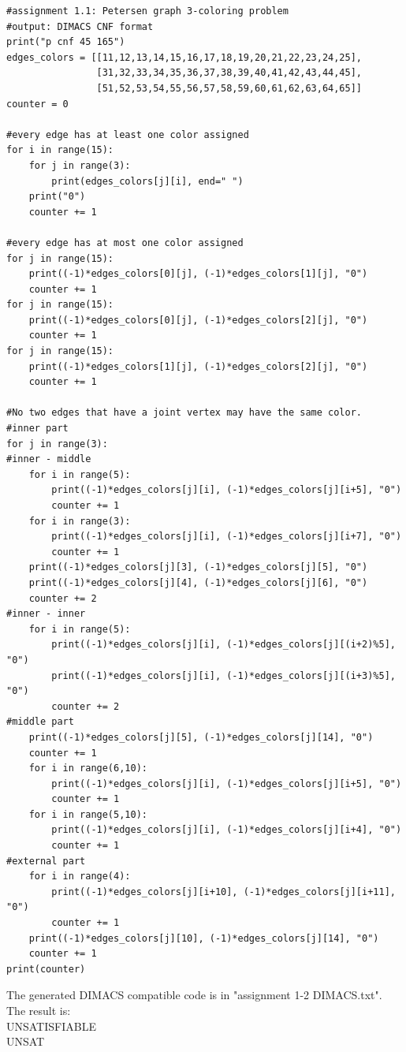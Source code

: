 \documentclass[a4paper,11pt]{article}
\theoremstyle{mytheor}
\begin{document}
\begin{lstlisting}[label={list:second},caption=Python code-DIMAC generator.]
#assignment 1.1: Petersen graph 3-coloring problem
#output: DIMACS CNF format
print("p cnf 45 165")
edges_colors = [[11,12,13,14,15,16,17,18,19,20,21,22,23,24,25],
                [31,32,33,34,35,36,37,38,39,40,41,42,43,44,45],
                [51,52,53,54,55,56,57,58,59,60,61,62,63,64,65]]
counter = 0

#every edge has at least one color assigned
for i in range(15):
    for j in range(3):
        print(edges_colors[j][i], end=" ")
    print("0")
    counter += 1
    
#every edge has at most one color assigned
for j in range(15):
    print((-1)*edges_colors[0][j], (-1)*edges_colors[1][j], "0")
    counter += 1
for j in range(15):
    print((-1)*edges_colors[0][j], (-1)*edges_colors[2][j], "0")
    counter += 1
for j in range(15):
    print((-1)*edges_colors[1][j], (-1)*edges_colors[2][j], "0")
    counter += 1

#No two edges that have a joint vertex may have the same color.
#inner part
for j in range(3):
#inner - middle
    for i in range(5):
        print((-1)*edges_colors[j][i], (-1)*edges_colors[j][i+5], "0")
        counter += 1
    for i in range(3):
        print((-1)*edges_colors[j][i], (-1)*edges_colors[j][i+7], "0")
        counter += 1
    print((-1)*edges_colors[j][3], (-1)*edges_colors[j][5], "0")
    print((-1)*edges_colors[j][4], (-1)*edges_colors[j][6], "0")
    counter += 2
#inner - inner
    for i in range(5):
        print((-1)*edges_colors[j][i], (-1)*edges_colors[j][(i+2)%5], "0")
        print((-1)*edges_colors[j][i], (-1)*edges_colors[j][(i+3)%5], "0")
        counter += 2
#middle part    
    print((-1)*edges_colors[j][5], (-1)*edges_colors[j][14], "0")
    counter += 1
    for i in range(6,10):
        print((-1)*edges_colors[j][i], (-1)*edges_colors[j][i+5], "0")
        counter += 1
    for i in range(5,10):
        print((-1)*edges_colors[j][i], (-1)*edges_colors[j][i+4], "0")
        counter += 1
#external part        
    for i in range(4):
        print((-1)*edges_colors[j][i+10], (-1)*edges_colors[j][i+11], "0")
        counter += 1
    print((-1)*edges_colors[j][10], (-1)*edges_colors[j][14], "0")
    counter += 1
print(counter)
\end{lstlisting}
The generated DIMACS compatible code is in "assignment 1-2 DIMACS.txt". The result is:\\
UNSATISFIABLE\\
UNSAT\\
\end{document}
